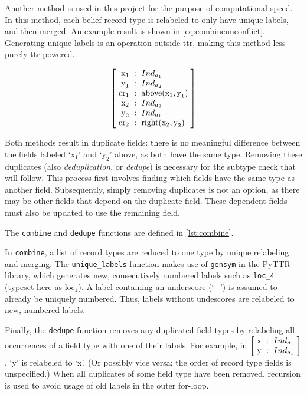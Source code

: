 Another method is used in this project for the purpose of computational speed.
In this method, each belief record type is relabeled to only have unique labels, and then merged.
An example result is shown in \autoref{eq:combineunconflict}.
Generating unique labels is an operation outside \gls{ttr}, making this method less purely \gls{ttr}-powered.

\begin{equation} \label{eq:combineunconflict}
\rec{
    \text{x}_1 &:& Ind_{a_1} \\
    \text{y}_1 &:& Ind_{a_2} \\
    \text{cr}_1 &:& \text{above}(\text{x}_1, \text{y}_1) \\
    \text{x}_2 &:& Ind_{a_2} \\
    \text{y}_2 &:& Ind_{a_1} \\
    \text{cr}_2 &:& \text{right}(\text{x}_2, \text{y}_2)
    }
\end{equation}

Both methods result in duplicate fields: there is no meaningful difference between the fields labeled `$\text{x}_1$' and `$\text{y}_2$' above, as both have the same type.
Removing these duplicates (also \textit{deduplication}, or \textit{dedupe}) is necessary for the subtype check that will follow.
This process first involves finding which fields have the same type as another field.
Subsequently, simply removing duplicates is not an option, as there may be other fields that depend on the duplicate field.
These dependent fields must also be updated to use the remaining field.

The \texttt{combine} and \texttt{dedupe} functions are defined in \autoref{lst:combine}.

In \texttt{combine}, a list of record types are reduced to one type by unique relabeling and merging.
The \texttt{unique\_labels} function makes use of \texttt{gensym} in the PyTTR library, which generates new, consecutively numbered labels such as \texttt{loc\_4} (typeset here as $\text{loc}_4$).
A label containing an underscore (`\_') is assumed to already be uniquely numbered.
Thus, labels without undescores are relabeled to new, numbered labels.

Finally, the \texttt{dedupe} function removes any duplicated field types by relabeling all occurrences of a field type with one of their labels. For example, in $\rec{\text{x} &:& Ind_{a_1} \\ \text{y} &:& Ind_{a_1}}$, `y' is relabeled to `x'.
(Or possibly vice versa; the order of record type fields is unspecified.)
When all duplicates of some field type have been removed, recursion is used to avoid usage of old labels in the outer for-loop.

